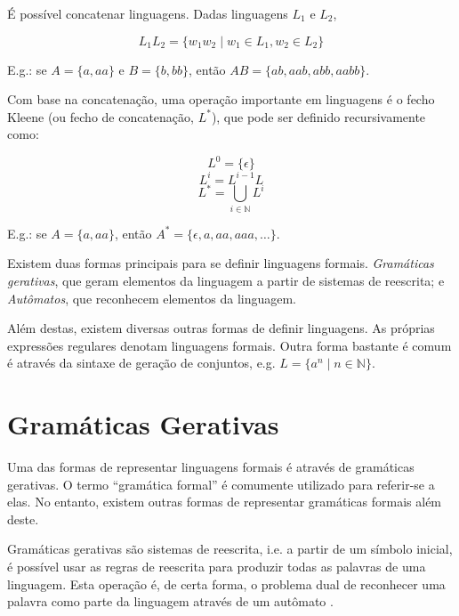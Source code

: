 \documentclass[a4paper,12pt,oneside,onecolumn]{uerj}
\begin{document}
É possível concatenar linguagens. Dadas linguagens $L_1$ e $L_2$,

\begin{equation*}
	L_1L_2 = \{w_1w_2 \mid w_1 \in L_1, w_2 \in L_2\}
\end{equation*}

E.g.: se $A = \{a, aa\}$ e $B = \{b, bb\}$, então $AB = \{ab, aab, abb, aabb\}$.


Com base na concatenação, uma operação importante em linguagens é o fecho Kleene (ou fecho de concatenação, $L^*$), que pode ser definido recursivamente como:

\begin{equation*}
	L^0 = \{\epsilon\}
\end{equation*}
\begin{equation*}
	L^i = L^{i-1}L
\end{equation*}
\begin{equation*}
	L^* = \bigcup_{i \in \mathbb{N}} L^i
\end{equation*}

E.g.: se $A = \{a, aa\}$, então $A^* = \{\epsilon, a, aa, aaa, \ldots\}$.

Existem duas formas principais para se definir linguagens formais. \emph{Gramáticas gerativas}, que geram elementos da linguagem a partir de sistemas de reescrita; e \emph{Autômatos}, que reconhecem elementos da linguagem. 

Além destas, existem diversas outras formas de definir linguagens. As próprias expressões regulares denotam linguagens formais. Outra forma bastante é comum é através da sintaxe de geração de conjuntos, e.g. $L=\{a^n \mid n \in \mathbb{N}\}$.

\section{Gramáticas Gerativas}

Uma das formas de representar linguagens formais é através de gramáticas gerativas. O termo ``gramática formal'' é comumente utilizado para referir-se a elas. No entanto, existem outras formas de representar gramáticas formais além deste.

Gramáticas gerativas são sistemas de reescrita, i.e. a partir de um símbolo inicial, é possível usar as regras de reescrita para produzir todas as palavras de uma linguagem. Esta operação é, de certa forma, o problema dual de reconhecer uma palavra como parte da linguagem através de um autômato \cite{bib:Ruohonen09}.
\end{document}
